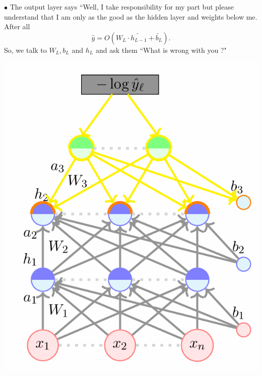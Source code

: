 \documentclass[11pt, a4paper]{article}
\begin{document}
\noindent
\begin{minipage}{0.5\textwidth}
    $\bullet$ The output layer says ``Well, I take responsibility for my part but please understand that I am only as the good as the hidden layer and weights below me. After all 
$$\hat{y} = O(W_L \cdot \utilde{h_{L-1}} + \utilde{b_L}).$$
So, we talk to $W_L, b_L$ and $h_L$ and ask them ``What is wrong with you ?"
\end{minipage}
\hfill
\begin{minipage}{0.45\textwidth}
    \includegraphics[scale = 0.5]{image_4.png}
\end{minipage}
\end{document}
